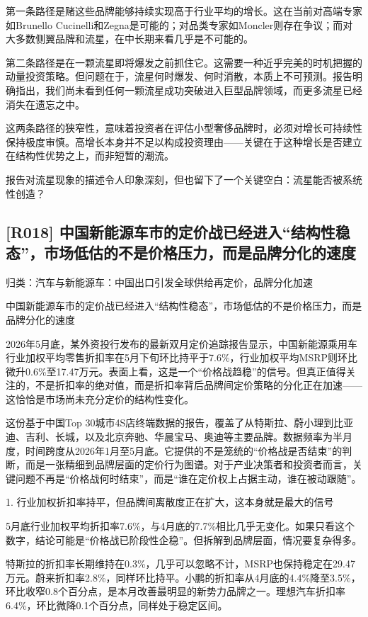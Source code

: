 \documentclass[11pt]{ctexart}
\begin{document}
第一条路径是赌这些品牌能够持续实现高于行业平均的增长。这在当前对高端专家如Brunello Cucinelli和Zegna是可能的；对品类专家如Moncler则存在争议；而对大多数侧翼品牌和流星，在中长期来看几乎是不可能的。

第二条路径是在一颗流星即将爆发之前抓住它。这需要一种近乎完美的时机把握的动量投资策略。但问题在于，流星何时爆发、何时消散，本质上不可预测。报告明确指出，我们尚未看到任何一颗流星成功突破进入巨型品牌领域，而更多流星已经消失在遗忘之中。

这两条路径的狭窄性，意味着投资者在评估小型奢侈品牌时，必须对增长可持续性保持极度审慎。高增长本身并不足以构成投资理由——关键在于这种增长是否建立在结构性优势之上，而非短暂的潮流。

报告对流星现象的描述令人印象深刻，但也留下了一个关键空白：流星能否被系统性创造？

\subsection{[R018] 中国新能源车市的定价战已经进入“结构性稳态”，市场低估的不是价格压力，而是品牌分化的速度}
{\small\color{refgray}归类：汽车与新能源车：中国出口引发全球供给再定价，品牌分化加速}

中国新能源车市的定价战已经进入“结构性稳态”，市场低估的不是价格压力，而是品牌分化的速度

2026年5月底，某外资投行发布的最新双月定价追踪报告显示，中国新能源乘用车行业加权平均零售折扣率在5月下旬环比持平于7.6\%，行业加权平均MSRP则环比微升0.6\%至17.47万元。表面上看，这是一个“价格战趋稳”的信号。但真正值得关注的，不是折扣率的绝对值，而是折扣率背后品牌间定价策略的分化正在加速——这恰恰是市场尚未充分定价的结构性变化。

这份基于中国Top 30城市4S店终端数据的报告，覆盖了从特斯拉、蔚小理到比亚迪、吉利、长城，以及北京奔驰、华晨宝马、奥迪等主要品牌。数据频率为半月度，时间跨度从2026年1月至5月底。它提供的不是笼统的“价格战是否结束”的判断，而是一张精细到品牌层面的定价行为图谱。对于产业决策者和投资者而言，关键问题不再是“价格战何时结束”，而是“谁在定价权上占据主动，谁在被动跟随”。

1. 行业加权折扣率持平，但品牌间离散度正在扩大，这本身就是最大的信号

5月底行业加权平均折扣率7.6\%，与4月底的7.7\%相比几乎无变化。如果只看这个数字，结论可能是“价格战已阶段性企稳”。但拆解到品牌层面，情况要复杂得多。

特斯拉的折扣率长期维持在0.3\%，几乎可以忽略不计，MSRP也保持稳定在29.47万元。蔚来折扣率2.8\%，同样环比持平。小鹏的折扣率从4月底的4.4\%降至3.5\%，环比收窄0.8个百分点，是本月改善最明显的新势力品牌之一。理想汽车折扣率6.4\%，环比微降0.1个百分点，同样处于稳定区间。
\end{document}
